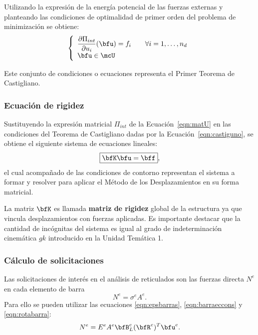 Utilizando la expresión de la energía potencial de las fuerzas externas y planteando las condiciones de optimalidad de primer orden del problema de minimización se obtiene:
%
\begin{equation}\label{eqn:castiguno}
\left\{ 
\begin{array}{l}
\displaystyle  \frac{\partial \Pi_{int} }{ \partial u_i}(\bfu) = f_i \qquad \forall i=1,\dots, n_d\\
  \bfu \in \mcU
\end{array}
  \right.
\end{equation}

Este conjunto de condiciones o ecuaciones representa el Primer Teorema de Castigliano. %
%





\subsubsection{ Ecuación de rigidez }

Sustituyendo la expresión matricial $\Pi_{int}$ de la Ecuación~\eqref{eqn:matU} en las condiciones del Teorema de Castigliano dadas por la Ecuación~\eqref{eqn:castiguno}, se obtiene el siguiente sistema de ecuaciones lineales:
%
\begin{equation}
\boxed{
	\bfK \bfu = \bff
},
\end{equation}
%
el cual acompañado de las condiciones de contorno representan el sistema a formar y resolver para aplicar el Método de los Desplazamientos en su forma matricial. %

La matriz $\bfK$ es llamada \textbf{matriz de rigidez} global de la estructura ya que vincula desplazamientos con fuerzas aplicadas. %
%
Es importante destacar que la cantidad de incógnitas del sistema es igual al grado de indeterminación cinemática $gk$ introducido en la Unidad Temática 1.

	\subsubsection{Cálculo de solicitaciones}

Las solicitaciones de interés en el análisis de reticulados son las fuerzas directa $N^e$ en cada elemento de barra
%
\begin{equation}
N^e = \sigma^e A^e.
\end{equation}
%
Para ello se pueden utilizar las ecuaciones \eqref{eqn:epsbarras}, \eqref{eqn:barraeccons} y \eqref{eqn:rotabarra}:
%
\begin{equation}\label{eqn:expSolic}
N^e = E^e A^e \bfB_L^e (\bfR^e)^T \bfu^e.
\end{equation}


